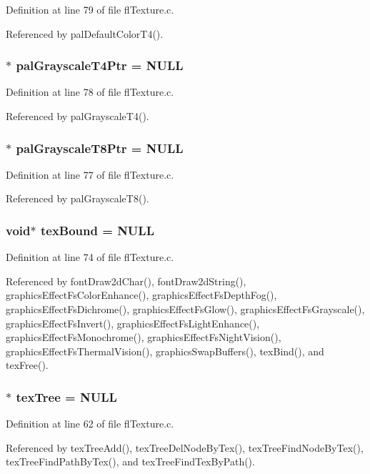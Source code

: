 Definition at line 79 of file fl\-Texture.c.

Referenced by pal\-Default\-Color\-T4().
\subsubsection{$\ast$ {\bf pal\-Grayscale\-T4Ptr} = NULL}\label{flTexture_8c_ae2e3745e97379224a96f7b81ee27903}




Definition at line 78 of file fl\-Texture.c.

Referenced by pal\-Grayscale\-T4().
\subsubsection{$\ast$ {\bf pal\-Grayscale\-T8Ptr} = NULL}\label{flTexture_8c_189b59bf2f96e1a3e1adf208b4e85c5b}




Definition at line 77 of file fl\-Texture.c.

Referenced by pal\-Grayscale\-T8().
\subsubsection{\setlength{\rightskip}{0pt plus 5cm}void$\ast$ {\bf tex\-Bound} = NULL}\label{flTexture_8c_669099ea7e18ce677cfd3a697f83b71c}




Definition at line 74 of file fl\-Texture.c.

Referenced by font\-Draw2d\-Char(), font\-Draw2d\-String(), graphics\-Effect\-Fs\-Color\-Enhance(), graphics\-Effect\-Fs\-Depth\-Fog(), graphics\-Effect\-Fs\-Dichrome(), graphics\-Effect\-Fs\-Glow(), graphics\-Effect\-Fs\-Grayscale(), graphics\-Effect\-Fs\-Invert(), graphics\-Effect\-Fs\-Light\-Enhance(), graphics\-Effect\-Fs\-Monochrome(), graphics\-Effect\-Fs\-Night\-Vision(), graphics\-Effect\-Fs\-Thermal\-Vision(), graphics\-Swap\-Buffers(), tex\-Bind(), and tex\-Free().
\subsubsection{$\ast$ {\bf tex\-Tree} = NULL}\label{flTexture_8c_d9e5b1375dfb7f8b280ae075d5bd7c0e}




Definition at line 62 of file fl\-Texture.c.

Referenced by tex\-Tree\-Add(), tex\-Tree\-Del\-Node\-By\-Tex(), tex\-Tree\-Find\-Node\-By\-Tex(), tex\-Tree\-Find\-Path\-By\-Tex(), and tex\-Tree\-Find\-Tex\-By\-Path().